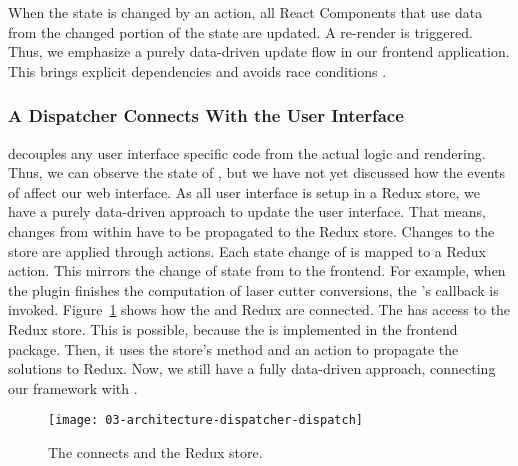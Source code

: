 \documentclass[../../ClassicThesis.tex]{subfiles}
\begin{document}
When the state is changed by an action, all React Components that use
data from the changed portion of the state are updated. A re-render is
triggered. Thus, we emphasize a purely data-driven update flow in our
frontend application. This brings explicit dependencies and avoids
race conditions \cite{redux}.

\subsubsection{A Dispatcher Connects {\convertify} With the User
  Interface}
\label{dispatch-and-dispatcher}



{\convertify} decouples any user interface specific code from the
actual logic and rendering. Thus, we can observe the state of
{\convertify}, but we have not yet discussed how the events of
{\convertify} affect our web interface. As all user interface is setup
in a Redux store, we have a purely data-driven approach to update the
user interface. That means, changes from within {\convertify} have to
be propagated to the Redux store. Changes to the store are applied
through actions. Each state change of {\convertify} is mapped to a
Redux action. This mirrors the change of state from {\convertify} to
the frontend. For example, when the  plugin
finishes the computation of laser cutter conversions, the
's  callback is invoked.
Figure~\ref{fig:dispatcher-dispatch} shows how the 
and Redux are connected. The  has access to the
Redux store. This is possible, because the  is
implemented in the frontend package. Then, it uses the store's
 method and an action to propagate the solutions to
Redux. Now, we still have a fully data-driven approach, connecting our
framework with {\platener}.

\begin{figure}
  \centering
  \texttt{[image: 03-architecture-dispatcher-dispatch]}
  \caption{The  connects {\convertify} and the Redux store.}
  \label{fig:dispatcher-dispatch}
\end{figure}
\end{document}
